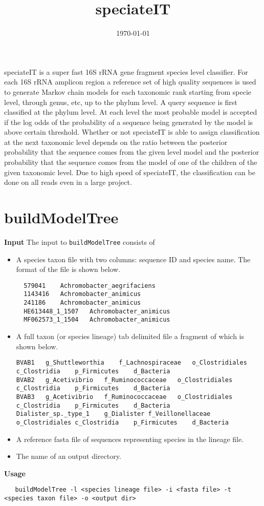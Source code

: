 \documentclass{article}
\title{speciateIT}
\date{\today}
\newcommand{\<}{\ensuremath{<}}
\renewcommand{\>}{\ensuremath{>}}
\begin{document}
\maketitle

speciateIT is a super fast 16S rRNA gene fragment species level classifier. For
each 16S rRNA amplicon region a reference set of high quality sequences is used
to generate Markov chain models for each taxonomic rank starting from specie
level, through genus, etc, up to the phylum level. A query sequence is first
classified at the phylum level. At each level the most probable model is
accepted if the log odds of the probability of a sequence being generated by the
model is above certain threshold. Whether or not speciateIT is able to assign
classification at the next taxonomic level depends on the ratio between the
posterior probability that the sequence comes from the given level model and the
posterior probability that the sequence comes from the model of one of the children
of the given taxonomic level. Due to high speed of speciateIT, the
classification can be done on all reads even in a large project.




\section*{buildModelTree}

\textbf{Input} The input to \verb+buildModelTree+ consists of
\tightlists
\begin{itemize}
\item A species taxon file with two columns: sequence ID and species name. The format of the
  file is shown below.
  \begin{verbatim}
  579041	Achromobacter_aegrifaciens
  1143416	Achromobacter_animicus
  241186	Achromobacter_animicus
  HE613448_1_1507	Achromobacter_animicus
  MF062573_1_1504	Achromobacter_animicus
  \end{verbatim}
\item A full taxon (or species lineage) tab delimited file a fragment of which
  is shown below.
  {\small
  \begin{verbatim}
BVAB1	g_Shuttleworthia	f_Lachnospiraceae	o_Clostridiales	c_Clostridia	p_Firmicutes	d_Bacteria
BVAB2	g_Acetivibrio	f_Ruminococcaceae	o_Clostridiales	c_Clostridia	p_Firmicutes	d_Bacteria
BVAB3	g_Acetivibrio	f_Ruminococcaceae	o_Clostridiales	c_Clostridia	p_Firmicutes	d_Bacteria
Dialister_sp._type_1	g_Dialister	f_Veillonellaceae	o_Clostridiales	c_Clostridia	p_Firmicutes	d_Bacteria
  \end{verbatim}}
  \item A reference fasta file of sequences representing species in the lineage
    file.
  \item The name of an output directory.
\end{itemize}
\vspace{7pt}
\textbf{Usage}
\begin{verbatim}
   buildModelTree -l <species lineage file> -i <fasta file> -t <species taxon file> -o <output dir>
\end{verbatim}
\end{document}
